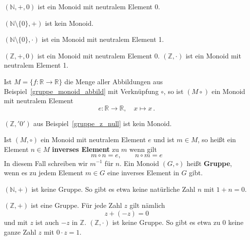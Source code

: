 \begin{beispiel} $(\mathbb N, +, 0)$ ist ein Monoid mit neutralem Element 0. \end{beispiel}

\begin{beispiel} $(\mathbb N \setminus \{ 0 \}, +)$ ist kein Monoid. \end{beispiel}

\begin{beispiel} $(\mathbb N \setminus \{ 0 \}, \cdot)$ ist ein Monoid mit neutralem Element 1.
\end{beispiel}

\begin{beispiel} $(\mathbb Z, +, 0)$ ist ein Monoid mit neutralem Element 0. 
$(\mathbb Z, \cdot)$ ist ein Monoid mit neutralem Element 1. \end{beispiel}

\begin{beispiel} Ist $M = \{f: \mathbb R \longrightarrow \mathbb R \}$ die Menge aller Abbildungen aus 
Beispiel~\ref{gruppe_monoid_abbild} mit Verknüpfung $\circ$, so ist $(M \circ)$ ein Monoid mit 
neutralem Element 
 	$$ e: \mathbb R \longrightarrow \mathbb R, \quad x \longmapsto x \, . $$
\end{beispiel}

\begin{beispiel} $(\mathbb Z, '0')$ aus Beispiel~\ref{gruppe_z_null} ist kein Monoid. \end{beispiel}

\begin{definition} Ist $(M, \circ)$ ein Monoid mit neutralem Element $e$ und ist $m \in M$, so heißt 
ein Element $n \in M$ \textbf{inverses Element} zu $m$ wenn gilt
  	$$ m \circ n  = e, \qquad n \circ m = e $$
In diesem Fall schreiben wir $m^{-1}$ für $n$.
Ein Monoid $(G, \circ)$ heißt \textbf{Gruppe}, wenn es zu jedem Element $m \in G$ eine 
inverses Element in $G$ gibt.
\end{definition}

\begin{beispiel} $(\mathbb N, +)$ ist keine Gruppe. So gibt es etwa keine natürliche Zahl $n$ mit
$1 + n = 0$. \end{beispiel}

\begin{beispiel} $(\mathbb Z, +)$ ist eine Gruppe. Für jede Zahl $z$ gilt nämlich 
  	$$ z + (-z) = 0 $$
und mit $z$ ist auch $-z$ in $\mathbb Z$. 
 $(\mathbb Z, \cdot)$ ist keine Gruppe. So gibt es etwa zu $0$ keine ganze Zahl $z$ mit $0 \cdot z = 1$.
\end{beispiel}

